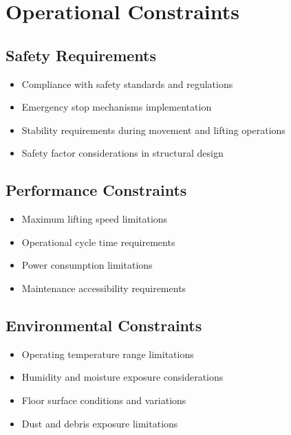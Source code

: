 \documentclass[../../main]{subfiles}
\begin{document}
\section{Operational Constraints}

\subsection{Safety Requirements}

\begin{itemize}
\item
  Compliance with safety standards and regulations
\item
  Emergency stop mechanisms implementation
\item
  Stability requirements during movement and lifting operations
\item
  Safety factor considerations in structural design
\end{itemize}

\subsection{Performance Constraints}

\begin{itemize}
\item
  Maximum lifting speed limitations
\item
  Operational cycle time requirements
\item
  Power consumption limitations
\item
  Maintenance accessibility requirements
\end{itemize}

\subsection{Environmental Constraints}

\begin{itemize}
\item
  Operating temperature range limitations
\item
  Humidity and moisture exposure considerations
\item
  Floor surface conditions and variations
\item
  Dust and debris exposure limitations
\end{itemize}

\end{document}
